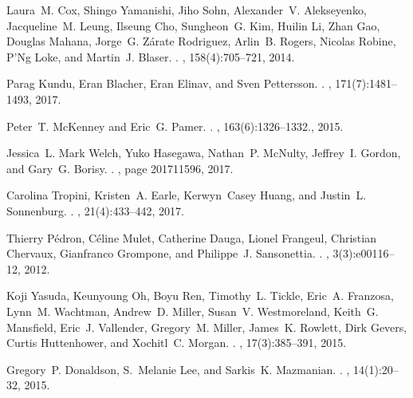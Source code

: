 \begin{thebibliography}{10}
	
	Laura~M. Cox, Shingo Yamanishi, Jiho Sohn, Alexander~V. Alekseyenko,
	Jacqueline~M. Leung, Ilseung Cho, Sungheon~G. Kim, Huilin Li, Zhan Gao,
	Douglas Mahana, Jorge~G. {Z{\'{a}}rate Rodriguez}, Arlin~B. Rogers, Nicolas
	Robine, P'Ng Loke, and Martin~J. Blaser.
	.
	, 158(4):705--721, 2014.
	
	Parag Kundu, Eran Blacher, Eran Elinav, and Sven Pettersson.
	.
	, 171(7):1481--1493, 2017.
	
	Peter~T. McKenney and Eric~G. Pamer.
	.
	, 163(6):1326--1332., 2015.
	
	Jessica~L. {Mark Welch}, Yuko Hasegawa, Nathan~P. McNulty, Jeffrey~I. Gordon,
	and Gary~G. Borisy.
	.
	, page
	201711596, 2017.
	
	Carolina Tropini, Kristen~A. Earle, Kerwyn~Casey Huang, and Justin~L.
	Sonnenburg.
	.
	, 21(4):433--442, 2017.
	
	Thierry P{\'{e}}dron, C{\'{e}}line Mulet, Catherine Dauga, Lionel Frangeul,
	Christian Chervaux, Gianfranco Grompone, and Philippe~J. Sansonettia.
	.
	, 3(3):e00116--12, 2012.
	
	Koji Yasuda, Keunyoung Oh, Boyu Ren, Timothy~L. Tickle, Eric~A. Franzosa,
	Lynn~M. Wachtman, Andrew~D. Miller, Susan~V. Westmoreland, Keith~G.
	Mansfield, Eric~J. Vallender, Gregory~M. Miller, James~K. Rowlett, Dirk
	Gevers, Curtis Huttenhower, and Xochitl~C. Morgan.
	.
	, 17(3):385--391, 2015.
	
	Gregory~P. Donaldson, S.~Melanie Lee, and Sarkis~K. Mazmanian.
	.
	, 14(1):20--32, 2015.
	

\end{thebibliography}
